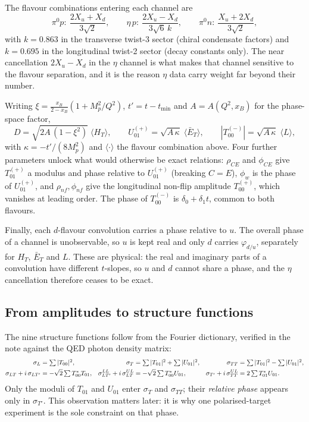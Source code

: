 \documentclass[11pt,a4paper]{article}
\newcommand{\sig}[1]{\sigma_{#1}}
\begin{document}
The flavour combinations entering each channel are
\begin{equation}
\pi^0 p:\ \frac{2X_u + X_d}{3\sqrt2}, \qquad
\eta\, p:\ \frac{2X_u - X_d}{3\sqrt6\,k}, \qquad
\pi^0 n:\ \frac{X_u + 2X_d}{3\sqrt2},
\end{equation}
with $k = 0.863$ in the transverse twist-3 sector (chiral condensate factors)
and $k = 0.695$ in the longitudinal twist-2 sector (decay constants only).
The near cancellation $2X_u - X_d$ in the $\eta$ channel is what makes that
channel sensitive to the flavour separation, and it is the reason $\eta$ data
carry weight far beyond their number.

Writing $\xi = \frac{x_B}{2-x_B}\left(1 + M_p^2/Q^2\right)$,
$t' = t - t_{\min}$ and $A = A(Q^2,x_B)$ for the phase-space factor,
\begin{equation}
D = \sqrt{2A\,(1-\xi^2)}\;\langle H_T\rangle, \qquad
U_{01}^{(+)} = \sqrt{A\,\kappa}\;\langle \bar E_T\rangle, \qquad
|T_{00}^{(-)}| = \sqrt{A\,\kappa}\;\langle L\rangle,
\end{equation}
with $\kappa = -t'/(8M_p^2)$ and $\langle\cdot\rangle$ the flavour combination
above.  Four further parameters unlock what would otherwise be exact
relations: $\rho_{CE}$ and $\phi_{CE}$ give $T_{01}^{(+)}$ a modulus and phase
relative to $U_{01}^{(+)}$ (breaking $C = E$), $\phi_w$ is the phase of
$U_{01}^{(+)}$, and $\rho_{nf}, \phi_{nf}$ give the longitudinal non-flip
amplitude $T_{00}^{(+)}$, which vanishes at leading order.  The phase of
$T_{00}^{(-)}$ is $\delta_0 + \delta_1 t$, common to both flavours.

Finally, each $d$-flavour convolution carries a phase relative to $u$.  The
overall phase of a channel is unobservable, so $u$ is kept real and only $d$
carries $\varphi_{d/u}$, separately for $H_T$, $\bar E_T$ and $L$.  These are
physical: the real and imaginary parts of a convolution have different
$t$-slopes, so $u$ and $d$ cannot share a phase, and the $\eta$ cancellation
therefore ceases to be exact.

\subsection{From amplitudes to structure functions}

The nine structure functions follow from the Fourier dictionary, verified in
the note against the QED photon density matrix:
\begin{align}
\sig{L} &= \textstyle\sum |T_{00}|^2, &
\sig{T} &= \textstyle\sum |T_{01}|^2 + \sum |U_{01}|^2, &
\sig{TT} &= \textstyle\sum |T_{01}|^2 - \sum |U_{01}|^2,\notag\\
\sig{LT} + i\,\sig{LT'} &= -\sqrt2 \textstyle\sum T_{00}^{*} T_{01}, &
\sig{LT'}^{LL} + i\,\sig{LT}^{UL} &= -\sqrt2 \textstyle\sum T_{00}^{*} U_{01}, &
\sig{T'} + i\,\sig{TT}^{UL} &= 2 \textstyle\sum T_{01}^{*} U_{01}.
\label{eq:gram}
\end{align}
Only the moduli of $T_{01}$ and $U_{01}$ enter $\sig{T}$ and $\sig{TT}$; their
\emph{relative phase} appears only in $\sig{T'}$.  This observation matters
later: it is why one polarised-target experiment is the sole constraint on that
phase.
\end{document}
